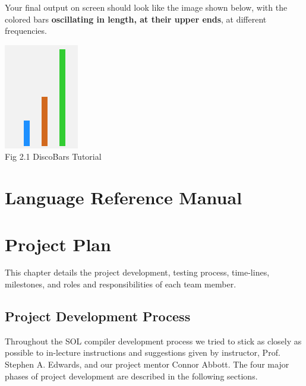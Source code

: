 \documentclass[letterpaper,12pt]{report}
\begin{document}
  Your final output on screen should look like the image shown below, with the colored bars \textbf{oscillating in length, at their upper ends}, at different frequencies.\\
  \begin{center}
      \includegraphics[scale=1]{dancing-bars.png}\\
      \caption{Fig 2.1 DiscoBars Tutorial}
  \end{center}


\chapter{Language Reference Manual} \label{lrm}

  

\chapter{Project Plan}

  This chapter details the project development, testing process, time-lines, milestones, and roles and responsibilities of each team member.

  \section{Project Development Process}
  Throughout the SOL compiler development process we tried to stick as closely as possible to in-lecture instructions and suggestions given by instructor, Prof. Stephen A. Edwards, and our project mentor Connor Abbott. The four major phases of project development are described in the following sections.
\end{document}
